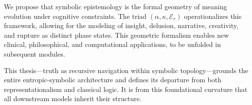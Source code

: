 We propose that symbolic epistemology is the formal geometry of meaning evolution under cognitive constraints. The triad $(\alpha, \kappa, \mathcal{E}_r)$ operationalizes this framework, allowing for the modeling of insight, delusion, narrative, creativity, and rupture as distinct phase states. This geometric formalism enables new clinical, philosophical, and computational applications, to be unfolded in subsequent modules.

This thesis—truth as recursive navigation within symbolic topology—grounds the entire entropic-symbolic architecture and defines its departure from both representationalism and classical logic. It is from this foundational curvature that all downstream models inherit their structure.